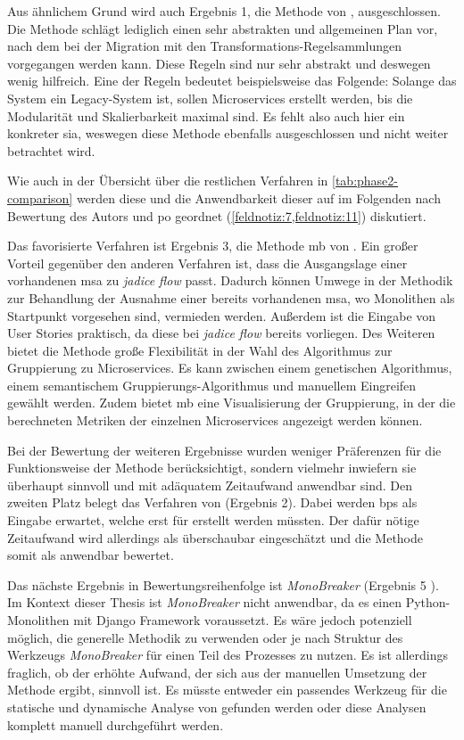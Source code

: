Aus ähnlichem Grund wird auch Ergebnis 1, die Methode von , ausgeschlossen.
Die Methode schlägt lediglich einen sehr abstrakten und allgemeinen Plan vor, nach dem bei der Migration mit den Transformations-Regelsammlungen vorgegangen werden kann.
Diese Regeln sind nur sehr abstrakt und deswegen wenig hilfreich.
Eine der Regeln bedeutet beispielsweise das Folgende:
Solange das System ein Legacy-System ist, sollen Microservices erstellt werden, bis die Modularität und Skalierbarkeit maximal sind.
Es fehlt also auch hier ein konkreter \gls{sia}, weswegen diese Methode ebenfalls ausgeschlossen und nicht weiter betrachtet wird.

Wie auch in der Übersicht über die restlichen Verfahren in \cref{tab:phase2-comparison} werden diese und die Anwendbarkeit dieser auf \jf im Folgenden nach Bewertung des Autors und \gls{po} geordnet (\cref{feldnotiz:7,feldnotiz:11}) diskutiert.



Das favorisierte Verfahren ist Ergebnis 3, die Methode \gls{mb} von .
Ein großer Vorteil gegenüber den anderen Verfahren ist, dass die Ausgangslage einer vorhandenen \gls{msa} zu \emph{jadice flow} passt.
Dadurch können Umwege in der Methodik zur Behandlung der Ausnahme einer bereits vorhandenen \gls{msa}, wo Monolithen als Startpunkt vorgesehen sind, vermieden werden.
Außerdem ist die Eingabe von User Stories praktisch, da diese bei \emph{jadice flow} bereits vorliegen.
Des Weiteren bietet die Methode große Flexibilität in der Wahl des Algorithmus zur Gruppierung zu Microservices.
Es kann zwischen einem genetischen Algorithmus, einem semantischem Gruppierungs-Algorithmus und manuellem Eingreifen gewählt werden.
Zudem bietet \gls{mb} eine Visualisierung der Gruppierung, in der die berechneten Metriken der einzelnen Microservices angezeigt werden können.

Bei der Bewertung der weiteren Ergebnisse wurden weniger Präferenzen für die Funktionsweise der Methode berücksichtigt, sondern vielmehr inwiefern sie überhaupt sinnvoll und mit adäquatem Zeitaufwand anwendbar sind.
Den zweiten Platz belegt das Verfahren von  (Ergebnis 2).
Dabei werden \glspl{bp} als Eingabe erwartet, welche erst für \jf erstellt werden müssten.
Der dafür nötige Zeitaufwand wird allerdings als überschaubar eingeschätzt und die Methode somit als anwendbar bewertet. 

Das nächste Ergebnis in Bewertungsreihenfolge ist \emph{MonoBreaker} (Ergebnis 5 \cite{arh-result-no-filter-5}).
Im Kontext dieser Thesis ist \emph{MonoBreaker} nicht anwendbar, da es einen Python-Monolithen mit Django Framework voraussetzt.
Es wäre jedoch potenziell möglich, die generelle Methodik zu verwenden oder je nach Struktur des Werkzeugs \emph{MonoBreaker} für einen Teil des Prozesses zu nutzen.
Es ist allerdings fraglich, ob der erhöhte Aufwand, der sich aus der manuellen Umsetzung der Methode ergibt, sinnvoll ist.
Es müsste entweder ein passendes Werkzeug für die statische und dynamische Analyse von \jf gefunden werden oder diese Analysen komplett manuell durchgeführt werden.

